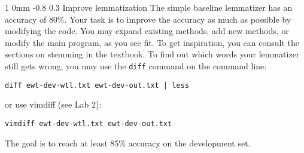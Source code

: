 \documentclass[11pt]{article}
\makeatletter
\newcommand{\newsec}[2]{\section{#1}\label{sec:#2}\noindent}
\renewcommand{\section}{\@startsection
{section}%
{1}%
{0mm}%
{-0.8\baselineskip}%
{0.3\baselineskip}%
{\bfseries\large}}%
\makeatother
\begin{document}
\newsec{Improve lemmatization}{improve}%
The simple baseline lemmatizer has an accuracy of 80\%. Your task is
to improve the accuracy as much as possible by modifying the code. You
may expand existing methods, add new methods, or modify the main
program, as you see fit. To get inspiration, you can consult the
sections on stemming in the textbook. To find out which words your
lemmatizer still gets wrong, you may use the \texttt{diff} command on
the command line:
\begin{verbatim}
diff ewt-dev-wtl.txt ewt-dev-out.txt | less
\end{verbatim}
or use vimdiff (see Lab 2):
\begin{verbatim}
vimdiff ewt-dev-wtl.txt ewt-dev-out.txt
\end{verbatim}
The goal is to reach at least 85\% accuracy on the development set.
\end{document}
